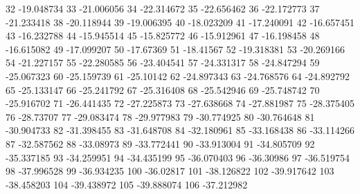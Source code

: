 32                      -19.048734
33                      -21.006056
34                      -22.314672
35                      -22.656462
36                      -22.172773
37                      -21.233418
38                      -20.118944
39                      -19.006395
40                      -18.023209
41                      -17.240091
42                      -16.657451
43                      -16.232788
44                      -15.945514
45                      -15.825772
46                      -15.912961
47                      -16.198458
48                      -16.615082
49                      -17.099207
50                       -17.67369
51                       -18.41567
52                      -19.318381
53                      -20.269166
54                      -21.227157
55                      -22.280585
56                      -23.404541
57                      -24.331317
58                      -24.847294
59                      -25.067323
60                      -25.159739
61                       -25.10142
62                      -24.897343
63                      -24.768576
64                      -24.892792
65                      -25.133147
66                      -25.241792
67                      -25.316408
68                      -25.542946
69                      -25.748742
70                      -25.916702
71                      -26.441435
72                      -27.225873
73                      -27.638668
74                      -27.881987
75                      -28.375405
76                       -28.73707
77                      -29.083474
78                      -29.977983
79                      -30.774925
80                      -30.764648
81                      -30.904733
82                      -31.398455
83                      -31.648708
84                      -32.180961
85                      -33.168438
86                      -33.114266
87                      -32.587562
88                       -33.08973
89                      -33.772441
90                      -33.913004
91                      -34.805709
92                      -35.337185
93                      -34.259951
94                      -34.435199
95                      -36.070403
96                       -36.30986
97                      -36.519754
98                      -37.996528
99                      -36.934235
100                       -36.02817
101                      -38.126822
102                      -39.917642
103                      -38.458203
104                      -39.438972
105                      -39.888074
106                      -37.212982
